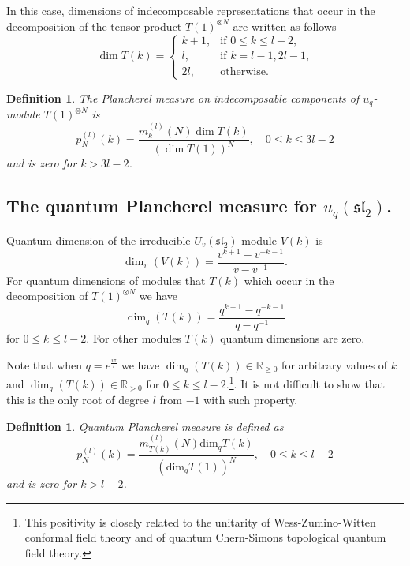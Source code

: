 \documentclass[11pt]{amsart}
\newcommand\lie[1]{\mathfrak{#1}}
\newtheorem{definition}[theorem]{Definition}
\begin{document}
In this case, dimensions of indecomposable representations that occur in the decomposition of the tensor product $T(1)^{\otimes N}$ are written as follows
\begin{equation*}
\dim T(k)=
\begin{cases}
k+1,&\text{if $0 \leq k\leq l-2$,}\\
l, & \text{if $k=l-1,2l-1$,}\\
2l,& \text{otherwise.}
\end{cases}
\end{equation*}

\begin{definition}The Plancherel measure on indecomposable components of $u_q$-module $T(1)^{\otimes N}$ is 
\begin{equation*}
p^{(l)}_N(k)=\frac{m^{(l)}_{k}(N)\dim T(k)}{(\dim  T(1))^N},\quad 0\leq k\leq 3l-2
\end{equation*}
and is zero for $k>3l-2$.
\end{definition}



\subsection{The quantum Plancherel measure for $u_q(\lie{sl}_2)$.}\label{qdims}
Quantum dimension \cite{KR} of the irreducible $U_v(\lie{sl}_2)$-module $V(k)$ is
\[
\dim_v(V(k))=\frac{v^{k+1}-v^{-k-1}}{v-v^{-1}}.
\]
For quantum dimensions of modules that $T(k)$ which occur in the decomposition of $T(1)^{\otimes N}$ we have
\[
\dim_q(T(k))=\frac{q^{k+1}-q^{-k-1}}{q-q^{-1}}
\]
for $0\leq k\leq l-2$. For other modules $T(k)$ quantum dimensions are zero.

Note that when $q=e^{\frac{i\pi}{l}}$ we have $\dim_q(T(k))\in\mathbb{R}_{\geq 0}$ for arbitrary values of $k$ and $\dim_q(T(k))\in\mathbb{R}_{> 0}$ for $0\leq k\leq l-2$.\footnote{This positivity is closely related to the unitarity of Wess-Zumino-Witten conformal field theory and
of quantum Chern-Simons topological quantum field theory.}. It is not
difficult to show that this is the only root of degree $l$ from $-1$ with such property.

\begin{definition}
Quantum Plancherel measure is defined as
\begin{equation*}
p^{(l)}_N(k)=\frac{m^{(l)}_{T(k)}(N)\mathrm{dim}_qT(k)}{(\mathrm{dim}_q T(1))^N},\quad 0\leq k\leq l-2
\end{equation*}
and is zero for $k>l-2$.
\end{definition}
\end{document}

